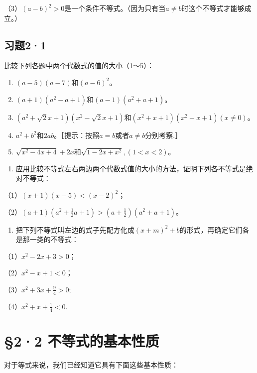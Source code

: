 （3）\((a - b)^2 > 0\)是一个条件不等式。（因为只有当\(a \neq b\)时这个不等式才能够成立。）

\subsection{习题2·1}

比较下列各题中两个代数式的值的大小（1～5）：

\begin{enumerate}[start=1]
\item
  \((a - 5)(a - 7)\)和\((a - 6)^{2}\)。
\item
  \((a + 1)(a^2 - a + 1)\)和\((a - 1)(a^2 + a + 1)\)。
\item
  \((a^2 + \sqrt{2} x + 1)(x^2 - \sqrt{2} x + 1)\)和\((x^2 + x + 1)(x^2 - x + 1)\)\((x \neq 0)\)。
\item
  \(a^2 + b^2\)和\(2ab\)。［提示：按照\(a = b\)或者\(a \neq b\)分别考察.］
\item
  \(\sqrt{x^2 - 4x + 4} + 2x\)和\(\sqrt{1 - 2x + x^2}, (1 < x < 2)\)。
\end{enumerate}

\begin{enumerate}[start=6]
\item
  应用比较不等式左右两边两个代数式值的大小的方法，证明下列各不等式是绝对不等式：
\end{enumerate}

（1）\((x + 1)(x - 5) < (x - 2)^{2}\)；

（2）\((a + 1)\left(a^2 + \frac{1}{2} a + 1\right) > \left(a + \frac{1}{2}\right)(a^2 + a + 1)\)。

\begin{enumerate}[start=7]
\item
  把下列不等式叫左边的式子先配方化成\((x + m)^2 + b\)的形式，再确定它们各是那一类的不等式：
\end{enumerate}

（1）\(x^{2} - 2x + 3 > 0\)；

（2）\(x^{2} - x + 1 < 0\)；

（3）\(x^{2} + 3x + \frac{9}{4} > 0;\)

（4）\(x^{2} + x + \frac{1}{4} < 0.\)

\section{§2·2 不等式的基本性质}

对于等式来说，我们已经知道它具有下面这些基本性质：

